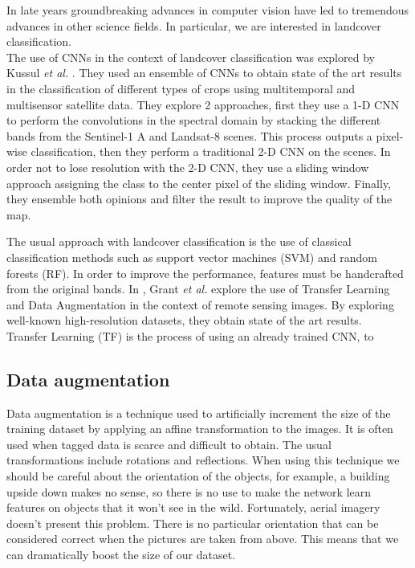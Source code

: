In late years groundbreaking advances in computer vision have led to tremendous advances in other science fields. In particular, we are interested in landcover classification.\\

The use of CNNs in the context of landcover classification was explored by Kussul \textit{et al.} \cite{7891032}. They used an ensemble of CNNs to obtain state of the art results in the classification of different types of crops using multitemporal and multisensor satellite data. They explore 2 approaches, first they use a 1-D CNN to perform the convolutions in the spectral domain by stacking the different bands from the Sentinel-1 A and Landsat-8 scenes. This process outputs a pixel-wise classification, then they perform a traditional 2-D CNN on the scenes. In order not to lose resolution with the 2-D CNN, they use a sliding window approach assigning the class to the center pixel of the sliding window. Finally, they ensemble both opinions and filter the result to improve the quality of the map.

The usual approach with landcover classification is the use of classical classification methods such as support vector machines (SVM) and random forests (RF). In order to improve the performance, features must be handcrafted from the original bands. In \cite{7858676}, Grant \textit{et al.} explore the use of Transfer Learning and Data Augmentation in the context of remote sensing images. By exploring well-known high-resolution datasets, they obtain state of the art results.\\

Transfer Learning (TF) is the process of using an already trained CNN, to 

\subsection{Data augmentation}

Data augmentation is a technique used to artificially increment the size of the training dataset by applying an affine transformation to the images. It is often used when tagged data is scarce and difficult to obtain. The usual transformations include rotations and reflections. When using this technique we should be careful about the orientation of the objects, for example, a building upside down makes no sense, so there is no use to make the network learn features on objects that it won't see in the wild. Fortunately, aerial imagery doesn't present this problem. There is no particular orientation that can be considered correct when the pictures are taken from above. This means that we can dramatically boost the size of our dataset.\\

